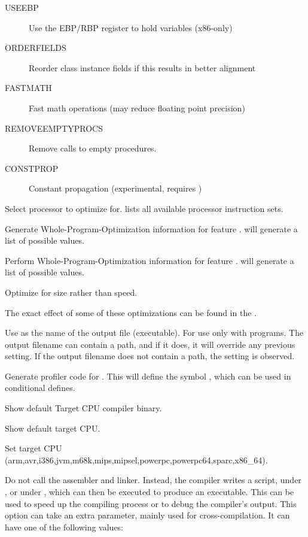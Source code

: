 \begin{description}
\begin{description}
\begin{description}
\item[USEEBP] Use the EBP/RBP register to hold variables (x86-only)
\item[ORDERFIELDS] Reorder class instance fields if this results in better alignment
\item[FASTMATH] Fast math operations (may reduce floating point precision)
\item[REMOVEEMPTYPROCS] Remove calls to empty procedures.
\item[CONSTPROP] Constant propagation (experimental, requires )
\end{description}
\item[pxxx] Select processor  to optimize for.  lists
all available processor instruction sets.
\item[Wxxx] Generate Whole-Program-Optimization information for feature .
 will generate a list of possible values.
\item[wxxx] Perform  Whole-Program-Optimization information for feature
.  will generate a list of possible values.
\item[s] Optimize for size rather than speed.
\end{description}
The exact effect of some of these optimizations can be found in the \progref.
\item [-oxxx]  Use  as the name of the output
file (executable). For use only with programs. The output filename can contain a
path, and if it does, it will override any previous  setting. If
the output filename does not contain a path, the  setting is
observed.
\item [-pg]  Generate profiler code for . This will
define the symbol , which can be used in conditional
defines.
\item[-PB]        Show default Target CPU compiler binary.
\item[-PP]        Show default target CPU.
\item[-Pxxx]      Set target CPU (arm,avr,i386,jvm,m68k,mips,mipsel,powerpc,powerpc64,sparc,x86\_64).
\item [-s]  Do not call the assembler and linker.
Instead, the compiler writes a script,  under \dos, or
 under \linux, which can then be executed to produce an
executable. This can be used to speed up the compiling process or to debug
the compiler's output. This option can take an extra parameter, mainly
used for cross-compilation. It can have one of the following values:

\end{description}

